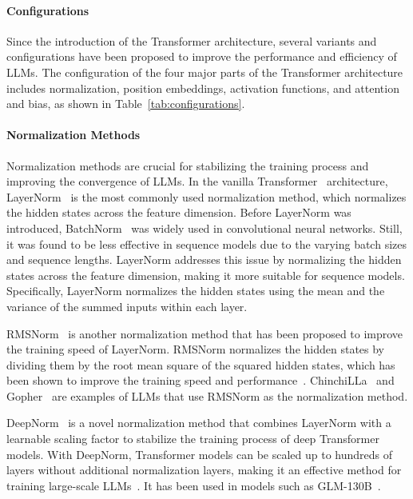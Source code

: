 \paragraph{Configurations}
\label{subsubsec:configurations}

Since the introduction of the Transformer architecture, several variants and configurations have been proposed to improve the performance and efficiency of LLMs.
The configuration of the four major parts of the Transformer architecture includes normalization, position embeddings, activation functions, and attention and bias, as shown in Table~\ref{tab:configurations}.

\paragraph{Normalization Methods}
\label{subsubsec:normalization}
Normalization methods are crucial for stabilizing the training process and improving the convergence of LLMs.
In the vanilla Transformer~\cite{vaswani2023attention} architecture, LayerNorm~\cite{ba2016layer} is the most commonly used normalization method, which normalizes the hidden states across the feature dimension.
Before LayerNorm was introduced, BatchNorm~\cite{ioffe2015batch} was widely used in convolutional neural networks.
Still, it was found to be less effective in sequence models due to the varying batch sizes and sequence lengths.
LayerNorm addresses this issue by normalizing the hidden states across the feature dimension, making it more suitable for sequence models.
Specifically, LayerNorm normalizes the hidden states using the mean and the variance of the summed inputs within each layer.

RMSNorm~\cite{zhang2019root} is another normalization method that has been proposed to improve the training speed of LayerNorm.
RMSNorm normalizes the hidden states by dividing them by the root mean square of the squared hidden states, which has been shown to improve the training speed and performance~\cite{narang2021transformer}.
ChinchiLLa~\cite{hoffmann2022training} and Gopher~\cite{rae2021scaling} are examples of LLMs that use RMSNorm as the normalization method.

DeepNorm~\cite{wang2022deepnet} is a novel normalization method that combines LayerNorm with a learnable scaling factor to stabilize the training process of deep Transformer models.
With DeepNorm, Transformer models can be scaled up to hundreds of layers without additional normalization layers, making it an effective method for training large-scale LLMs~\cite{wang2022deepnet}.
It has been used in models such as GLM-130B~\cite{zeng2022glm130b}.

